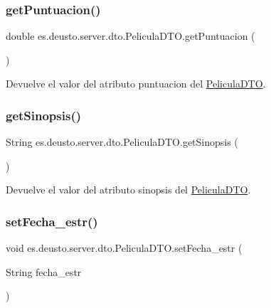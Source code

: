 \subsubsection{\texorpdfstring{getPuntuacion()}{getPuntuacion()}}
{\footnotesize\ttfamily double es.\+deusto.\+server.\+dto.\+Pelicula\+D\+T\+O.\+get\+Puntuacion (\begin{DoxyParamCaption}{ }\end{DoxyParamCaption})}

Devuelve el valor del atributo puntuacion del \mbox{\hyperlink{classes_1_1deusto_1_1server_1_1dto_1_1_pelicula_d_t_o}{Pelicula\+D\+TO}}. \mbox{\label{classes_1_1deusto_1_1server_1_1dto_1_1_pelicula_d_t_o_a7552e89e622dc5518868d38f1f45948b}} 
\subsubsection{\texorpdfstring{getSinopsis()}{getSinopsis()}}
{\footnotesize\ttfamily String es.\+deusto.\+server.\+dto.\+Pelicula\+D\+T\+O.\+get\+Sinopsis (\begin{DoxyParamCaption}{ }\end{DoxyParamCaption})}

Devuelve el valor del atributo sinopsis del \mbox{\hyperlink{classes_1_1deusto_1_1server_1_1dto_1_1_pelicula_d_t_o}{Pelicula\+D\+TO}}. \mbox{\label{classes_1_1deusto_1_1server_1_1dto_1_1_pelicula_d_t_o_a9def0f1adc3189268b5a36bd8d8fe667}} 
\subsubsection{\texorpdfstring{setFecha\_estr()}{setFecha\_estr()}}
{\footnotesize\ttfamily void es.\+deusto.\+server.\+dto.\+Pelicula\+D\+T\+O.\+set\+Fecha\+\_\+estr (\begin{DoxyParamCaption}\item[{String}]{fecha\+\_\+estr }\end{DoxyParamCaption})}

